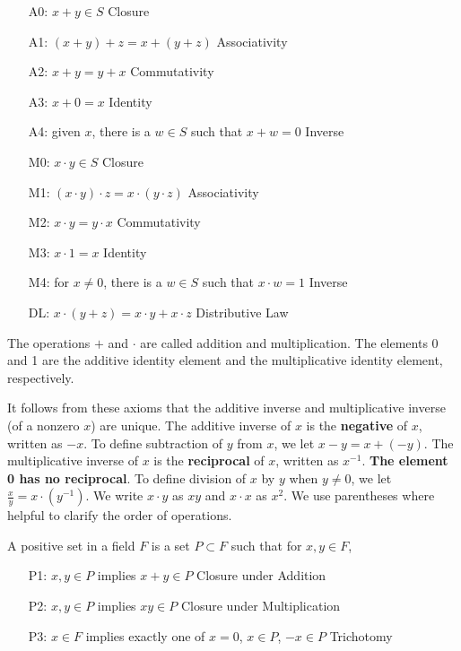 \begin{enumerate}
\begin{definition}
\begin{itemize}
  \item[A0:] \( x + y \in S \) \hfill Closure
  \item[A1:] \( (x + y) + z = x + (y + z) \) \hfill Associativity
  \item[A2:] \( x + y = y + x \) \hfill Commutativity
  \item[A3:] \( x + 0 = x \) \hfill Identity
  \item[A4:] given \( x \), there is a \( w \in S \) such that \( x + w = 0 \) \hfill Inverse
  \item[M0:] \( x \cdot y \in S \) \hfill Closure
  \item[M1:] \( (x \cdot y) \cdot z = x \cdot (y \cdot z) \) \hfill Associativity
  \item[M2:] \( x \cdot y = y \cdot x \) \hfill Commutativity
  \item[M3:] \( x \cdot 1 = x \) \hfill Identity
  \item[M4:] for \( x \neq 0 \), there is a \( w \in S \) such that \( x \cdot w = 1 \) \hfill Inverse
  \item[DL:] \( x \cdot (y + z) = x \cdot y + x \cdot z \) \hfill Distributive Law
\end{itemize}

\end{definition}
The operations \( + \) and \( \cdot \) are called addition and multiplication. The elements 0 and 1 are the additive identity element and the multiplicative identity element, respectively.   


It follows from these axioms that the additive inverse and multiplicative inverse (of a nonzero \( x \)) are unique. The additive inverse of \( x \) is the \textbf{negative} of \( x \), written as \( -x \). To define subtraction of \( y \) from \( x \), we let \( x - y = x + (-y) \). The multiplicative inverse of \( x \) is the \textbf{reciprocal} of \( x \), written as \( x^{-1} \). \textbf{The element 0 has no reciprocal}. To define division of \( x \) by \( y \) when \( y \neq 0 \), we let \( \frac{x}{y} = x \cdot (y^{-1}) \). We write \( x \cdot y \) as \( xy \) and \( x \cdot x \) as \( x^2 \). We use parentheses where helpful to clarify the order of operations.

\begin{definition}\label{axi:order}
     A positive set in a field \( F \) is a set \( P \subset F \) such that for \( x, y \in F \),

\begin{itemize}
  \item[P1:] \( x, y \in P \) implies \( x + y \in P \) \hfill Closure under Addition
  \item[P2:] \( x, y \in P \) implies \( xy \in P \) \hfill Closure under Multiplication
  \item[P3:] \( x \in F \) implies exactly one of \( x = 0 \), \( x \in P \), \( -x \in P \) \hfill Trichotomy
\end{itemize}


\end{definition}
\end{enumerate}
